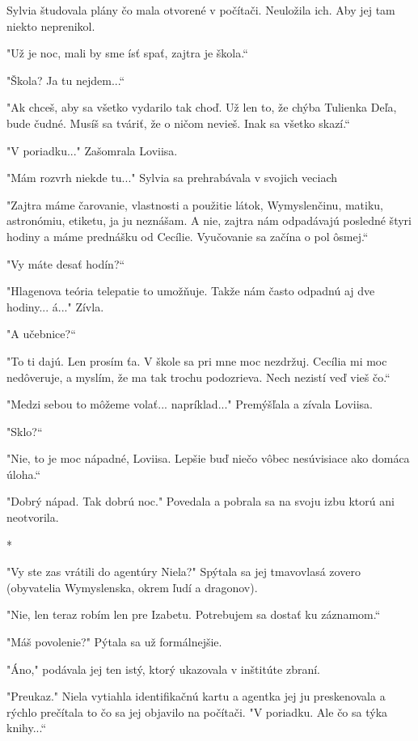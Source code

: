 \documentclass{book}
\begin{document}
Sylvia študovala plány čo mala otvorené v počítači. Neuložila ich. Aby jej tam niekto neprenikol.

"$ $Už je noc, mali by sme ísť spať, zajtra je škola.“

"$ $Škola? Ja tu nejdem...“

"$ $Ak chceš, aby sa všetko vydarilo tak choď. Už len to, že chýba Tulienka Deľa, bude čudné. Musíš sa tváriť, že o ničom nevieš. Inak sa všetko skazí.“

"$ $V poriadku..."$ $ Zašomrala Loviisa.

"$ $Mám rozvrh niekde tu..."$ $ Sylvia sa prehrabávala v svojich veciach

"$ $Zajtra máme čarovanie, vlastnosti a použitie látok, Wymyslenčinu, matiku, astronómiu, etiketu, ja ju neznášam. A nie, zajtra nám odpadávajú posledné štyri hodiny a máme prednášku od Cecílie. Vyučovanie sa začína o pol ôsmej.“

"$ $Vy máte desať hodín?“

"$ $Hlagenova teória telepatie to umožňuje. Takže nám často odpadnú aj dve hodiny... á..."$ $ Zívla.

"$ $A učebnice?“

"$ $To ti dajú. Len prosím ťa. V škole sa pri mne moc nezdržuj. Cecília mi moc nedôveruje, a myslím, že ma tak trochu podozrieva. Nech nezistí veď vieš čo.“

"$ $Medzi sebou to môžeme volať... napríklad..."$ $ Premýšľala a zívala Loviisa.

"$ $Sklo?“

"$ $Nie, to je moc nápadné, Loviisa. Lepšie buď niečo vôbec nesúvisiace ako domáca úloha.“

"$ $Dobrý nápad. Tak dobrú noc."$ $ Povedala a pobrala sa na svoju izbu ktorú ani neotvorila.

\begin{center}

*

\end{center}

"$ $Vy ste zas vrátili do agentúry Niela?"$ $ Spýtala sa jej tmavovlasá zovero (obyvatelia Wymyslenska, okrem ľudí a dragonov).

"$ $Nie, len teraz robím len pre Izabetu. Potrebujem sa dostať ku záznamom.“

"$ $Máš povolenie?"$ $ Pýtala sa už formálnejšie.

"$ $Áno,"$ $ podávala jej ten istý, ktorý ukazovala v inštitúte zbraní.

"$ $Preukaz."$ $ Niela vytiahla identifikačnú kartu a agentka jej ju preskenovala a rýchlo prečítala to čo sa jej objavilo na počítači. "$ $V poriadku. Ale čo sa týka knihy...“
\end{document}

